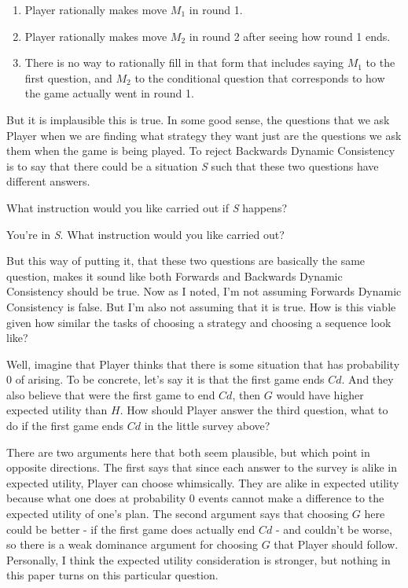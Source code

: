 \documentclass[
  12pt,
]{article}
\providecommand{\tightlist}{%
  \setlength{\itemsep}{0pt}\setlength{\parskip}{0pt}}
\begin{document}
\begin{enumerate}
\def\labelenumi{\arabic{enumi}.}
\tightlist
\item
  Player rationally makes move \(M_1\) in round 1.
\item
  Player rationally makes move \(M_2\) in round 2 after seeing how round
  1 ends.
\item
  There is no way to rationally fill in that form that includes saying
  \(M_1\) to the first question, and \(M_2\) to the conditional question
  that corresponds to how the game actually went in round 1.
\end{enumerate}

But it is implausible this is true. In some good sense, the questions
that we ask Player when we are finding what strategy they want just are
the questions we ask them when the game is being played. To reject
Backwards Dynamic Consistency is to say that there could be a situation
\emph{S} such that these two questions have different answers.

\begin{description}
\tightlist
\item[\textbf{Question S1}]
What instruction would you like carried out if \emph{S} happens?
\item[\textbf{Question S2}]
You're in \emph{S}. What instruction would you like carried out?
\end{description}

But this way of putting it, that these two questions are basically the
same question, makes it sound like both Forwards and Backwards Dynamic
Consistency should be true. Now as I noted, I'm not assuming Forwards
Dynamic Consistency is false. But I'm also not assuming that it is true.
How is this viable given how similar the tasks of choosing a strategy
and choosing a sequence look like?

Well, imagine that Player thinks that there is some situation that has
probability 0 of arising. To be concrete, let's say it is that the first
game ends \(Cd\). And they also believe that were the first game to end
\(Cd\), then \(G\) would have higher expected utility than \(H\). How
should Player answer the third question, what to do if the first game
ends \(Cd\) in the little survey above?

There are two arguments here that both seem plausible, but which point
in opposite directions. The first says that since each answer to the
survey is alike in expected utility, Player can choose whimsically. They
are alike in expected utility because what one does at probability 0
events cannot make a difference to the expected utility of one's plan.
The second argument says that choosing \(G\) here could be better - if
the first game does actually end \(Cd\) - and couldn't be worse, so
there is a weak dominance argument for choosing \(G\) that Player should
follow. Personally, I think the expected utility consideration is
stronger, but nothing in this paper turns on this particular question.
\end{document}
